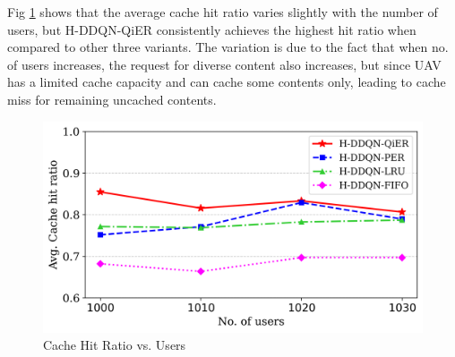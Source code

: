 \documentclass[journal]{IEEEtran}
\begin{document}
Fig \ref{fig:avg_chr_vs_users} shows that the average cache hit ratio varies slightly with the number of users, but H-DDQN-QiER consistently achieves the highest hit ratio when compared to other three variants. The variation is due to the fact that when no. of users increases, the request for diverse content also increases, but since UAV has a limited cache capacity and can cache some contents only,  leading to cache miss for remaining uncached contents.
\begin{figure}[htbp]
    \centering
    \includegraphics[width=\linewidth]{MinMax Cost Scaled/avg_chr_vs_users_line.png}  %
    \caption{Cache Hit Ratio vs. Users}
    \label{fig:avg_chr_vs_users}
\end{figure}
\end{document}

